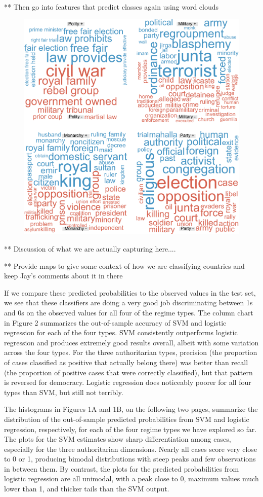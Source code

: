 \documentclass[pdftex,12pt,fullpage,oneside]{amsart}
\begin{document}
** Then go into features that predict classes again using word clouds

\begin{figure}[ht]
	\centering
	\includegraphics[width=.7\textwidth]{pol_bin_wrdCloud}
\end{figure}
\FloatBarrier

** Discussion of what we are actually capturing here....

** Provide maps to give some context of how we are classifying countries and keep Jay's comments about it in there

If we compare these predicted probabilities to the observed values in the test set, we see that these classifiers are doing a very good job discriminating between 1s and 0s on the observed values for all four of the regime types. The column chart in Figure 2 summarizes the out-of-sample accuracy of SVM and logistic regression for each of the four types. SVM consistently outperforms logistic regression and produces extremely good results overall, albeit with some variation across the four types. For the three authoritarian types, precision (the proportion of cases classified as positive that actually belong there) was better than recall (the proportion of positive cases that were correctly classified), but that pattern is reversed for democracy. Logistic regression does noticeably poorer for all four types than SVM, but still not terribly.

The histograms in Figures 1A and 1B, on the following two pages, summarize the distribution of the out-of-sample predicted probabilities from SVM and logistic regression, respectively, for each of the four regime types we have explored so far.  The plots for the SVM estimates show sharp differentiation among cases, especially for the three authoritarian dimensions. Nearly all cases score very close to 0 or 1, producing bimodal distributions with steep peaks and few observations in between them. By contrast, the plots for the predicted probabilities from logistic regression are all unimodal, with a peak close to 0, maximum values much lower than 1, and thicker tails than the SVM output. 
\end{document}
